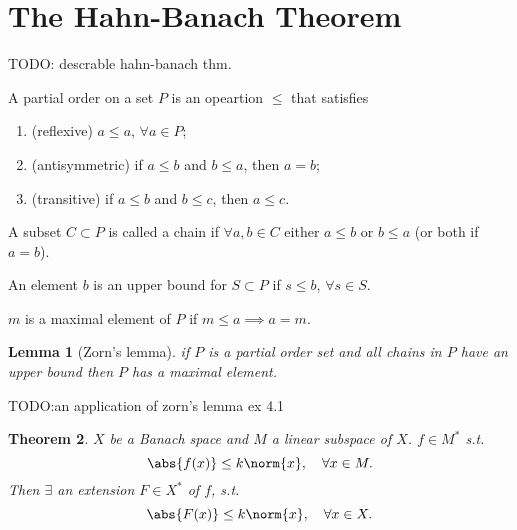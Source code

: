 \documentclass[a4paper]{book}
\newtheorem{thm}{Theorem}[chapter]
\newtheorem{lemma}[thm]{Lemma}
\DeclarePairedDelimiter{\norm}\lVert\rVert
\DeclarePairedDelimiter{\abs}\lvert\rvert
\begin{document}
 \section{The Hahn-Banach Theorem}
 TODO: descrable hahn-banach thm.
 \begin{myDef}
     A partial order on a set $P$ is an opeartion $\leq$ that satisfies
     \begin{enumerate}
         \item (reflexive) $a \leq a$, $\forall a \in P$;
         \item (antisymmetric) if $a \leq b$ and $b \leq a$, then $a = b$;
         \item (transitive) if $a \leq b$ and $b \leq c$, then $a \leq c$.
     \end{enumerate}
     
     A subset $C \subset P$ is called a chain if $\forall a, b \in C$ either $a \leq b$ or $b \leq a$ (or both if $a = b$).

     An element $b$ is an upper bound for $S \subset P$ if $s \leq b$, $\forall s \in S.$

     $m$ is a maximal element of $P$ if $m \leq a \implies a = m.$
 \end{myDef}
 \begin{lemma}[Zorn's lemma]
     if $P$ is a partial order set and all chains in $P$ have an upper bound then $P$ has a maximal element.
 \end{lemma}
 TODO:an application of zorn's lemma ex 4.1
 \begin{thm}
     $X$ be a Banach space and $M$ a linear subspace of $X$. $f \in M^*$ s.t.
     \begin{equation}
         \abs{f(x)} \leq k\norm{x}, \quad \forall x \in M.
     \end{equation}
     Then $\exists$ an extension $F \in X^*$ of $f$, s.t.
     \begin{equation}
         \abs{F(x)} \leq k\norm{x}, \quad \forall x \in X.
     \end{equation}
 \end{thm}
\end{document}
